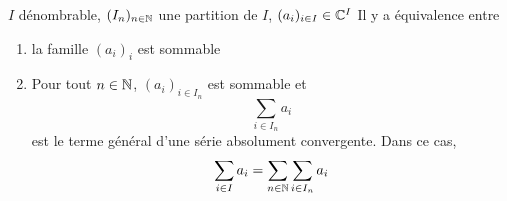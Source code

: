 \begin{thm}
    \Hyp $I$ dénombrable, $(I_n)_{n\in\mathbb N}$ une partition de $I$, $(a_i)_{i\in I}\in \mathbb C^I$
    \Conc Il y a équivalence entre \begin{enumerate}[left=1.1cm,label=\alph{enumi}.]
        \item la famille $(a_i)_i$ est sommable
        \item Pour tout $n\in\mathbb N$, $(a_i)_{i\in I_n}$ est sommable et \[
                \sum_{i\in I_n}a_i
            \]
            est le terme général d'une série absolument convergente. Dans ce cas, \[
                \sum_{i\in I}a_i=\sum_{n\in\mathbb N}\sum_{i\in I_n}a_i
            \]
    \end{enumerate}
\end{thm}

